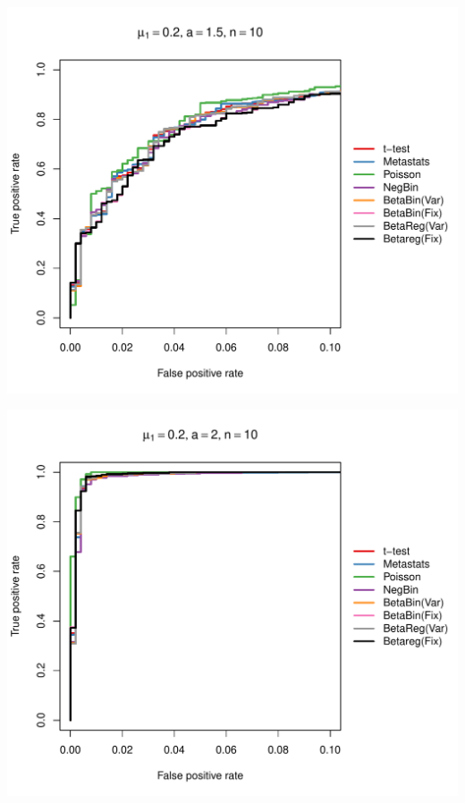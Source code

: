\documentclass[12pt]{article}\usepackage{graphicx, color}
\makeatletter
\def\maxwidth{ %
  \ifdim\Gin@nat@width>\linewidth
    \linewidth
  \else
    \Gin@nat@width
  \fi
}
\newenvironment{knitrout}{}{} %
\makeatother
\begin{document}
\begin{knitrout}
{\centering \includegraphics[width=\maxwidth]{figure/rocs13} 

}




{\centering \includegraphics[width=\maxwidth]{figure/rocs14} 

}





\end{knitrout}
\end{document}
